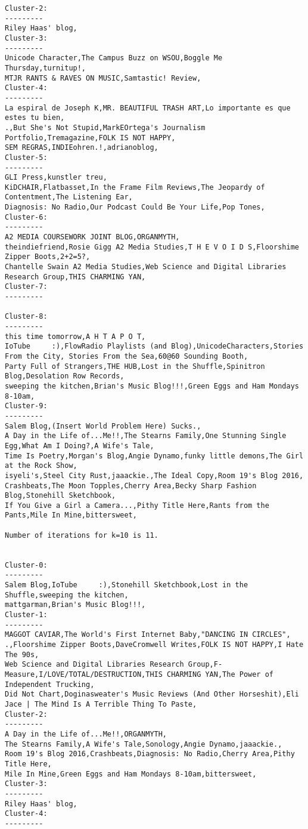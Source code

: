 \begin{lstlisting}[style=nonumbers, keywords={select, from, where, limit, and}]
Cluster-2:
---------
Riley Haas' blog,
Cluster-3:
---------
Unicode Character,The Campus Buzz on WSOU,Boggle Me Thursday,turnitup!,
MTJR RANTS & RAVES ON MUSIC,Samtastic! Review,
Cluster-4:
---------
La espiral de Joseph K,MR. BEAUTIFUL TRASH ART,Lo importante es que estes tu bien,
.,But She's Not Stupid,MarkEOrtega's Journalism Portfolio,Tremagazine,FOLK IS NOT HAPPY,
SEM REGRAS,INDIEohren.!,adrianoblog,
Cluster-5:
---------
GLI Press,kunstler treu,
KiDCHAIR,Flatbasset,In the Frame Film Reviews,The Jeopardy of Contentment,The Listening Ear,
Diagnosis: No Radio,Our Podcast Could Be Your Life,Pop Tones,
Cluster-6:
---------
A2 MEDIA COURSEWORK JOINT BLOG,ORGANMYTH,
theindiefriend,Rosie Gigg A2 Media Studies,T H E V O I D S,Floorshime Zipper Boots,2+2=5?,
Chantelle Swain A2 Media Studies,Web Science and Digital Libraries Research Group,THIS CHARMING YAN,
Cluster-7:
---------

Cluster-8:
---------
this time tomorrow,A H T A P O T,
IoTube     :),FlowRadio Playlists (and Blog),UnicodeCharacters,Stories From the City, Stories From the Sea,60@60 Sounding Booth,
Party Full of Strangers,THE HUB,Lost in the Shuffle,Spinitron Blog,Desolation Row Records,
sweeping the kitchen,Brian's Music Blog!!!,Green Eggs and Ham Mondays 8-10am,
Cluster-9:
---------
Salem Blog,(Insert World Problem Here) Sucks.,
A Day in the Life of...Me!!,The Stearns Family,One Stunning Single Egg,What Am I Doing?,A Wife's Tale,
Time Is Poetry,Morgan's Blog,Angie Dynamo,funky little demons,The Girl at the Rock Show,
isyeli's,Steel City Rust,jaaackie.,The Ideal Copy,Room 19's Blog 2016,
Crashbeats,The Moon Topples,Cherry Area,Becky Sharp Fashion Blog,Stonehill Sketchbook,
If You Give a Girl a Camera...,Pithy Title Here,Rants from the Pants,Mile In Mine,bittersweet,

Number of iterations for k=10 is 11.


Cluster-0:
---------
Salem Blog,IoTube     :),Stonehill Sketchbook,Lost in the Shuffle,sweeping the kitchen,
mattgarman,Brian's Music Blog!!!,
Cluster-1:
---------
MAGGOT CAVIAR,The World's First Internet Baby,"DANCING IN CIRCLES",
.,Floorshime Zipper Boots,DaveCromwell Writes,FOLK IS NOT HAPPY,I Hate The 90s,
Web Science and Digital Libraries Research Group,F-Measure,I/LOVE/TOTAL/DESTRUCTION,THIS CHARMING YAN,The Power of Independent Trucking,
Did Not Chart,Doginasweater's Music Reviews (And Other Horseshit),Eli Jace | The Mind Is A Terrible Thing To Paste,
Cluster-2:
---------
A Day in the Life of...Me!!,ORGANMYTH,
The Stearns Family,A Wife's Tale,Sonology,Angie Dynamo,jaaackie.,
Room 19's Blog 2016,Crashbeats,Diagnosis: No Radio,Cherry Area,Pithy Title Here,
Mile In Mine,Green Eggs and Ham Mondays 8-10am,bittersweet,
Cluster-3:
---------
Riley Haas' blog,
Cluster-4:
---------


\end{lstlisting}
